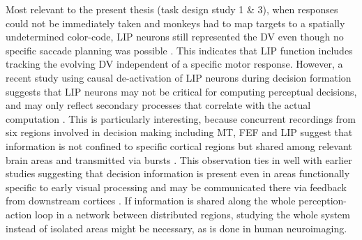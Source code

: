 Most relevant to the present thesis (task design study 1 \& 3), when responses could not be immediately taken and monkeys had to map targets to a spatially undetermined color-code, LIP neurons still represented the DV even though no specific saccade planning was possible \parencite{Bennur2011}. This indicates that LIP function includes tracking the evolving DV independent of a specific motor response. However, a recent study using causal de-activation of LIP neurons during decision formation suggests that LIP neurons may not be critical for computing perceptual decisions, and may only reflect secondary processes that correlate with the actual computation \parencite{Katz2016}. This is particularly interesting, because concurrent recordings from six regions involved in decision making including MT, FEF and LIP suggest that information is not confined to specific cortical regions but shared among relevant brain areas and transmitted via bursts \parencite{Siegel2015}. This observation ties in well with earlier studies suggesting that decision information is present even in areas functionally specific to early visual processing and may be communicated there via feedback from downstream cortices \parencite{Donner2008,Nienborg2009,Siegel2011}. If information is shared along the whole perception-action loop in a network between distributed regions, studying the whole system instead of isolated areas might be necessary, as is done in human neuroimaging. 

